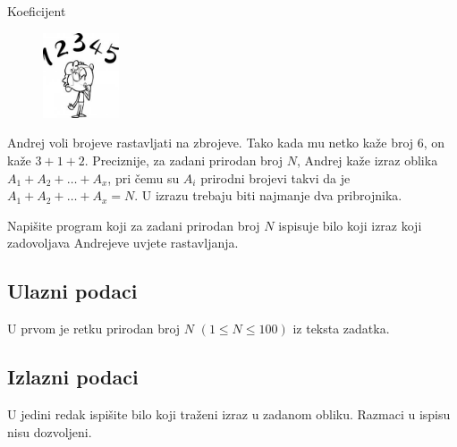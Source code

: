 \begin{statement}[
  problempoints=20,
  timelimit=1 sekunda,
  memorylimit=512 MiB,
]{Koeficijent}

\setlength\intextsep{-0.1cm}
\begin{figure}
\centering
\includegraphics[width=0.2\textwidth]{img/plenki.jpeg}
\end{figure}

Andrej voli brojeve rastavljati na zbrojeve. Tako kada mu netko kaže broj $6$,
on kaže $3+1+2$. Preciznije, za zadani prirodan broj $N$, Andrej kaže izraz
oblika $A_1+A_2+\dots+A_x$, pri čemu su $A_i$ prirodni brojevi takvi da je
$A_1+A_2+\dots+A_x=N$. U izrazu trebaju biti najmanje dva pribrojnika.

Napišite program koji za zadani prirodan broj $N$ ispisuje bilo koji izraz koji
zadovoljava Andrejeve uvjete rastavljanja.


\subsection*{Ulazni podaci}
U prvom je retku prirodan broj $N$ $(1 \le N \le 100)$ iz teksta zadatka.\\

\subsection*{Izlazni podaci}
U jedini redak ispišite bilo koji traženi izraz u zadanom obliku. Razmaci u
ispisu nisu dozvoljeni.



\end{statement}
